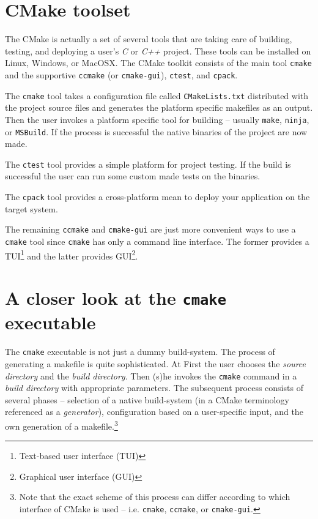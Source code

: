 \documentclass[12pt,oneside]{fithesis2}
\begin{document}
\section{CMake toolset}

The CMake is actually a set of several tools that are taking care of building, testing, and deploying a user's \emph{C} or \emph{C++} project. These tools can be installed on Linux, Windows, or MacOSX. The CMake toolkit consists of the main tool \texttt{cmake} and the supportive \texttt{ccmake} (or \texttt{cmake-gui}), \texttt{ctest}, and \texttt{cpack}.

The \texttt{cmake} tool takes a configuration file called \texttt{CMakeLists.txt} distributed with the project source files and generates the platform specific makefiles as an output. Then the user invokes a platform specific tool for building -- usually \texttt{make}, \texttt{ninja}, or \texttt{MSBuild}. If the process is successful the native binaries of the project are now made.

The \texttt{ctest} tool provides a simple platform for project testing. If the build is successful the user can run some custom made tests on the binaries.

The \texttt{cpack} tool provides a cross-platform mean to deploy your application on the target system.

The remaining \texttt{ccmake} and \texttt{cmake-gui} are just more convenient ways to use a \texttt{cmake} tool since \texttt{cmake} has only a command line interface. The former provides a TUI\footnote{Text-based user interface (TUI)} and the latter provides GUI\footnote{Graphical user interface (GUI)}.

\section{A closer look at the \texttt{cmake} executable}

The \texttt{cmake} executable is not just a dummy build-system. The process of generating a makefile is quite sophisticated. At First the user chooses the \emph{source directory} and the \emph{build directory}. Then (s)he invokes the \texttt{cmake} command in a \emph{build directory} with appropriate parameters. The subsequent process consists of several phases -- selection of a native build-system (in a CMake terminology referenced as a \emph{generator}), configuration based on a user-specific input, and the own generation of a makefile.\footnote{Note that the exact scheme of this process can differ according to which interface of CMake is used -- i.e. \texttt{cmake}, \texttt{ccmake}, or \texttt{cmake-gui}.}
\end{document}
